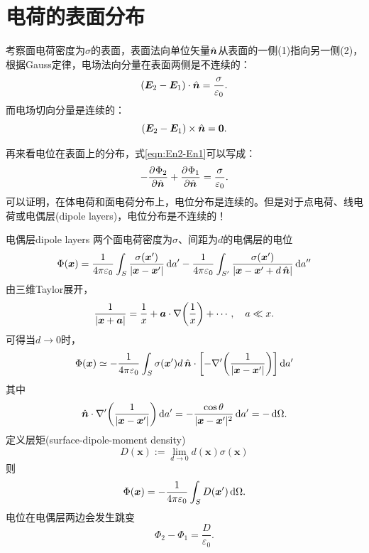 \section{电荷的表面分布}

考察面电荷密度为$\sigma$的表面，表面法向单位矢量$\mathop{}\!\hat{\bm{n}}$从表面的一侧(1)指向另一侧(2)，根据Gauss定律，电场法向分量在表面两侧是不连续的：
\begin{equation}
    \label{eqn:En2-En1}
    (\bm E_2-\bm E_1)\cdot\mathop{}\!\hat{\bm{n}}=\frac\sigma{\varepsilon_0}.
\end{equation}
而电场切向分量是连续的：
\begin{equation}
    (\bm E_2-\bm E_1)\times\mathop{}\!\hat{\bm{n}}=\bm 0.
\end{equation}

再来看电位在表面上的分布，式\eqref{eqn:En2-En1}可以写成：
\begin{equation}
    -\frac{\partial^{{}}\Phi_2}{\partial{\mathop{}\!\hat{\bm{n}}}^{{}}}+\frac{\partial^{{}}\Phi_1}{\partial{\mathop{}\!\hat{\bm{n}}}^{{}}}=\frac\sigma{\varepsilon_0}.
\end{equation}
可以证明，在体电荷和面电荷分布上，电位分布是连续的。但是对于点电荷、线电荷或电偶层(dipole layers)，电位分布是不连续的！
\begin{example}{电偶层}{dipole layers}
    两个面电荷密度为$\sigma$、间距为$d$的电偶层的电位 
    \begin{align*}
        \Phi(\bm x)=\frac1{4\pi\varepsilon_0}\int_S\frac{\sigma(\bm x')}{|\bm x-\bm x'|}\mathop{}\!\mathrm{d} a'-\frac1{4\pi\varepsilon_0}\int_{S'}\frac{\sigma(\bm x')}{|\bm x-\bm x'+d\mathop{}\!\hat{\bm{n}}|}\mathop{}\!\mathrm{d} a''
    \end{align*}
    由三维Taylor展开，
    \[
        \frac1{|\bm x+\bm a|}=\frac1x+\bm a\cdot\nabla\biggl(\frac1x\biggr)+\cdots,\quad a\ll x.
    \]
    可得当$d\to0$时，
    \[
        \Phi(\bm x)\simeq-\frac1{4\pi\varepsilon_0}\int_S\sigma(\bm x')d\mathop{}\!\hat{\bm{n}}\cdot\biggl[-\nabla'\biggl(\frac1{|\bm x-\bm x'|}\biggr)\biggr]\mathop{}\!\mathrm{d} a'
    \]
    其中
    \[
        \mathop{}\!\hat{\bm{n}}\cdot\nabla'\biggl(\frac1{|\bm x-\bm x'|}\biggr)\mathop{}\!\mathrm{d} a'=-\frac{\cos\theta}{|\bm x-\bm x'|^2}\mathop{}\!\mathrm{d} a'=-\mathop{}\!\mathrm{d}\Omega.
    \]
    定义层矩(surface-dipole-moment density) 
    \[
        D(\bm x):=\lim_{d\to 0}d(\bm x)\sigma(\bm x)
    \]
    则
    \begin{equation}
        \Phi(\bm x)=-\frac1{4\pi\varepsilon_0}\int_SD(\bm x')\mathop{}\!\mathrm{d}\Omega.
    \end{equation}
    电位在电偶层两边会发生跳变
    \begin{equation}
        \Phi_2-\Phi_1=\frac D{\varepsilon_0}.
    \end{equation}
\end{example}

